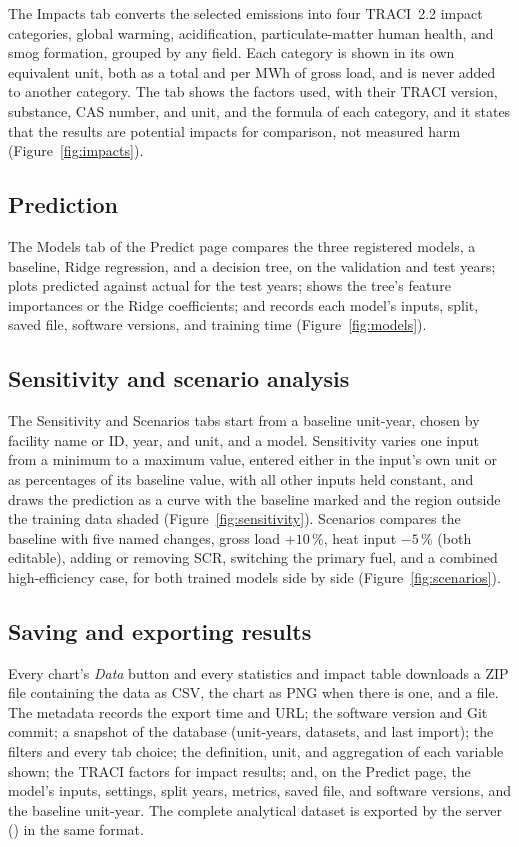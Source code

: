 \documentclass[11pt,a4paper]{article}
\begin{document}
The Impacts tab converts the selected emissions into four TRACI~2.2 impact categories, global
warming, acidification, particulate-matter human health, and smog formation, grouped by any
field. Each category is shown in its own equivalent unit, both as a total and per MWh of gross
load, and is never added to another category. The tab shows the factors used, with their TRACI
version, substance, CAS number, and unit, and the formula of each category, and it states that
the results are potential impacts for comparison, not measured harm (Figure~\ref{fig:impacts}).

\subsection{Prediction}

The Models tab of the Predict page compares the three registered models, a baseline, Ridge
regression, and a decision tree, on the validation and test years; plots predicted against
actual \NOx{} for the test years; shows the tree's feature importances or the Ridge
coefficients; and records each model's inputs, split, saved file, software versions, and
training time (Figure~\ref{fig:models}).

\subsection{Sensitivity and scenario analysis}

The Sensitivity and Scenarios tabs start from a baseline unit-year, chosen by facility name or
ID, year, and unit, and a model. Sensitivity varies one input from a minimum to a maximum value, entered
either in the input's own unit or as percentages of its baseline value, with all other inputs
held constant, and draws the prediction as a curve with the
baseline marked and the region outside the training data shaded (Figure~\ref{fig:sensitivity}).
Scenarios compares the baseline with five named changes, gross load $+10\,\%$, heat input
$-5\,\%$ (both editable), adding or removing SCR, switching the primary fuel, and a combined
high-efficiency case, for both trained models side by side (Figure~\ref{fig:scenarios}).

\subsection{Saving and exporting results}
\label{sec:exports}

Every chart's \emph{Data} button and every statistics and impact table downloads a ZIP file
containing the data as CSV, the chart as PNG when there is one, and a  file.
The metadata records the export time and URL; the software version and Git commit; a snapshot of
the database (unit-years, datasets, and last import); the filters and every tab choice; the
definition, unit, and aggregation of each variable shown; the TRACI factors for impact results;
and, on the Predict page, the model's inputs, settings, split years, metrics, saved file, and
software versions, and the baseline unit-year. The complete analytical dataset is exported by
the server () in the same format.
\end{document}
